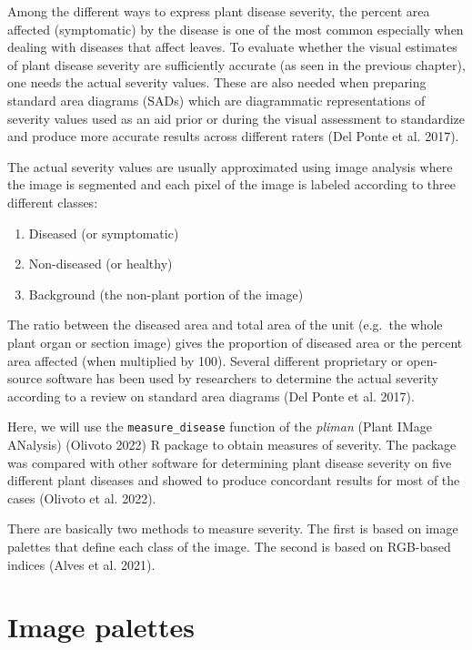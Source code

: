 \documentclass[
  letterpaper,
  DIV=11,
  numbers=noendperiod]{scrreprt}
\providecommand{\tightlist}{%
  \setlength{\itemsep}{0pt}\setlength{\parskip}{0pt}}\usepackage{longtable,booktabs,array}
\begin{document}
Among the different ways to express plant disease severity, the percent
area affected (symptomatic) by the disease is one of the most common
especially when dealing with diseases that affect leaves. To evaluate
whether the visual estimates of plant disease severity are sufficiently
accurate (as seen in the previous chapter), one needs the actual
severity values. These are also needed when preparing standard area
diagrams (SADs) which are diagrammatic representations of severity
values used as an aid prior or during the visual assessment to
standardize and produce more accurate results across different raters
(Del Ponte et al. 2017).

The actual severity values are usually approximated using image analysis
where the image is segmented and each pixel of the image is labeled
according to three different classes:

\begin{enumerate}
\def\labelenumi{\arabic{enumi}.}
\tightlist
\item
  Diseased (or symptomatic)
\item
  Non-diseased (or healthy)
\item
  Background (the non-plant portion of the image)
\end{enumerate}

The ratio between the diseased area and total area of the unit (e.g.~the
whole plant organ or section image) gives the proportion of diseased
area or the percent area affected (when multiplied by 100). Several
different proprietary or open-source software has been used by
researchers to determine the actual severity according to a review on
standard area diagrams (Del Ponte et al. 2017).

Here, we will use the \texttt{measure\_disease} function of the
\emph{pliman} (Plant IMage ANalysis) (Olivoto 2022) R package to obtain
measures of severity. The package was compared with other software for
determining plant disease severity on five different plant diseases and
showed to produce concordant results for most of the cases (Olivoto et
al. 2022).

There are basically two methods to measure severity. The first is based
on image palettes that define each class of the image. The second is
based on RGB-based indices (Alves et al. 2021).

\hypertarget{image-palettes}{%
\section{Image palettes}\label{image-palettes}}
\end{document}
